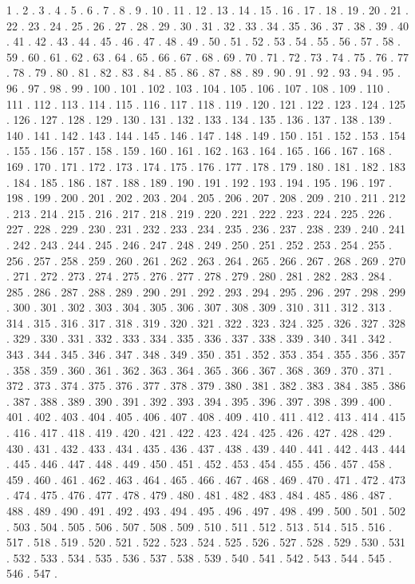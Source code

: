 \documentclass[10pt]{mybook4}
\begin{document}
\begin{Schunk}
\begin{Soutput}
1 . 2 . 3 . 4 . 5 . 6 . 7 . 8 . 9 . 10 . 11 . 12 . 13 . 14 . 15 . 16 . 17 . 18 . 19 . 20 . 21 . 22 . 23 . 24 . 25 . 26 . 27 . 28 . 29 . 30 . 31 . 32 . 33 . 34 . 35 . 36 . 37 . 38 . 39 . 40 . 41 . 42 . 43 . 44 . 45 . 46 . 47 . 48 . 49 . 50 . 51 . 52 . 53 . 54 . 55 . 56 . 57 . 58 . 59 . 60 . 61 . 62 . 63 . 64 . 65 . 66 . 67 . 68 . 69 . 70 . 71 . 72 . 73 . 74 . 75 . 76 . 77 . 78 . 79 . 80 . 81 . 82 . 83 . 84 . 85 . 86 . 87 . 88 . 89 . 90 . 91 . 92 . 93 . 94 . 95 . 96 . 97 . 98 . 99 . 100 . 101 . 102 . 103 . 104 . 105 . 106 . 107 . 108 . 109 . 110 . 111 . 112 . 113 . 114 . 115 . 116 . 117 . 118 . 119 . 120 . 121 . 122 . 123 . 124 . 125 . 126 . 127 . 128 . 129 . 130 . 131 . 132 . 133 . 134 . 135 . 136 . 137 . 138 . 139 . 140 . 141 . 142 . 143 . 144 . 145 . 146 . 147 . 148 . 149 . 150 . 151 . 152 . 153 . 154 . 155 . 156 . 157 . 158 . 159 . 160 . 161 . 162 . 163 . 164 . 165 . 166 . 167 . 168 . 169 . 170 . 171 . 172 . 173 . 174 . 175 . 176 . 177 . 178 . 179 . 180 . 181 . 182 . 183 . 184 . 185 . 186 . 187 . 188 . 189 . 190 . 191 . 192 . 193 . 194 . 195 . 196 . 197 . 198 . 199 . 200 . 201 . 202 . 203 . 204 . 205 . 206 . 207 . 208 . 209 . 210 . 211 . 212 . 213 . 214 . 215 . 216 . 217 . 218 . 219 . 220 . 221 . 222 . 223 . 224 . 225 . 226 . 227 . 228 . 229 . 230 . 231 . 232 . 233 . 234 . 235 . 236 . 237 . 238 . 239 . 240 . 241 . 242 . 243 . 244 . 245 . 246 . 247 . 248 . 249 . 250 . 251 . 252 . 253 . 254 . 255 . 256 . 257 . 258 . 259 . 260 . 261 . 262 . 263 . 264 . 265 . 266 . 267 . 268 . 269 . 270 . 271 . 272 . 273 . 274 . 275 . 276 . 277 . 278 . 279 . 280 . 281 . 282 . 283 . 284 . 285 . 286 . 287 . 288 . 289 . 290 . 291 . 292 . 293 . 294 . 295 . 296 . 297 . 298 . 299 . 300 . 301 . 302 . 303 . 304 . 305 . 306 . 307 . 308 . 309 . 310 . 311 . 312 . 313 . 314 . 315 . 316 . 317 . 318 . 319 . 320 . 321 . 322 . 323 . 324 . 325 . 326 . 327 . 328 . 329 . 330 . 331 . 332 . 333 . 334 . 335 . 336 . 337 . 338 . 339 . 340 . 341 . 342 . 343 . 344 . 345 . 346 . 347 . 348 . 349 . 350 . 351 . 352 . 353 . 354 . 355 . 356 . 357 . 358 . 359 . 360 . 361 . 362 . 363 . 364 . 365 . 366 . 367 . 368 . 369 . 370 . 371 . 372 . 373 . 374 . 375 . 376 . 377 . 378 . 379 . 380 . 381 . 382 . 383 . 384 . 385 . 386 . 387 . 388 . 389 . 390 . 391 . 392 . 393 . 394 . 395 . 396 . 397 . 398 . 399 . 400 . 401 . 402 . 403 . 404 . 405 . 406 . 407 . 408 . 409 . 410 . 411 . 412 . 413 . 414 . 415 . 416 . 417 . 418 . 419 . 420 . 421 . 422 . 423 . 424 . 425 . 426 . 427 . 428 . 429 . 430 . 431 . 432 . 433 . 434 . 435 . 436 . 437 . 438 . 439 . 440 . 441 . 442 . 443 . 444 . 445 . 446 . 447 . 448 . 449 . 450 . 451 . 452 . 453 . 454 . 455 . 456 . 457 . 458 . 459 . 460 . 461 . 462 . 463 . 464 . 465 . 466 . 467 . 468 . 469 . 470 . 471 . 472 . 473 . 474 . 475 . 476 . 477 . 478 . 479 . 480 . 481 . 482 . 483 . 484 . 485 . 486 . 487 . 488 . 489 . 490 . 491 . 492 . 493 . 494 . 495 . 496 . 497 . 498 . 499 . 500 . 501 . 502 . 503 . 504 . 505 . 506 . 507 . 508 . 509 . 510 . 511 . 512 . 513 . 514 . 515 . 516 . 517 . 518 . 519 . 520 . 521 . 522 . 523 . 524 . 525 . 526 . 527 . 528 . 529 . 530 . 531 . 532 . 533 . 534 . 535 . 536 . 537 . 538 . 539 . 540 . 541 . 542 . 543 . 544 . 545 . 546 . 547 . 
\end{Soutput}
\end{Schunk}
\end{document}
